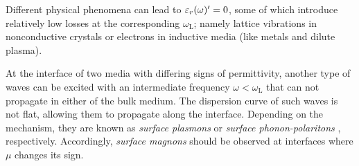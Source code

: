 Different physical phenomena can lead to $\varepsilon_r(\omega)' = 0$, some of which introduce relatively low losses at the corresponding $\omega_{\text{L}}$; namely lattice vibrations in nonconductive crystals or electrons in inductive media (like metals and dilute plasma). 

At the interface of two media with differing signs of permittivity, another type of waves can be excited with an intermediate frequency $\omega < \omega_{\text{L}}$ that can not propagate in either of the bulk medium. The dispersion curve of such waves is not flat, allowing them to propagate along the interface. Depending on the mechanism, they are known as  \textit{surface plasmons} or \textit{surface phonon-polaritons} \cite[p. 87]{klingshirn2007semiconductor}, respectively. Accordingly, \textit{surface magnons} should be observed at interfaces where $\mu$ changes its sign.
